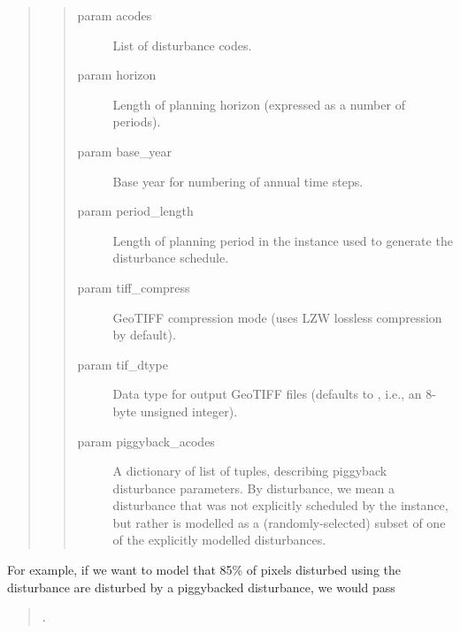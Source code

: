 \documentclass[letterpaper,10pt,english]{sphinxmanual}
\begin{document}
\begin{fulllineitems}
\begin{quote}
\begin{quote}
\begin{description}
\item[{param acodes}] \leavevmode
List of disturbance codes.

\item[{param horizon}] \leavevmode
Length of planning horizon (expressed as a number of periods).

\item[{param base\_year}] \leavevmode
Base year for numbering of annual time steps.

\item[{param period\_length}] \leavevmode
Length of planning period in the  instance used to generate the disturbance schedule.

\item[{param tiff\_compress}] \leavevmode
GeoTIFF compression mode (uses LZW lossless compression by default).

\item[{param tif\_dtype}] \leavevmode
Data type for output GeoTIFF files (defaults to , i.e., an 8-byte unsigned integer).

\item[{param piggyback\_acodes}] \leavevmode
A dictionary of list of tuples, describing piggyback disturbance parameters. By  disturbance, we mean a disturbance that was not explicitly scheduled by the  instance, but rather is modelled as a (randomly-selected) subset of one of the explicitly modelled disturbances.

\end{description}\end{quote}
\end{quote}

For example, if we want to model that 85\% of pixels disturbed using the  disturbance are disturbed by a piggybacked  disturbance, we would pass
\begin{quote}

.
\end{quote}

\begin{fulllineitems}
\label{\detokenize{spatial:spatial.ForestRaster.allocate_schedule}}
\end{fulllineitems}


\end{fulllineitems}
\end{document}
